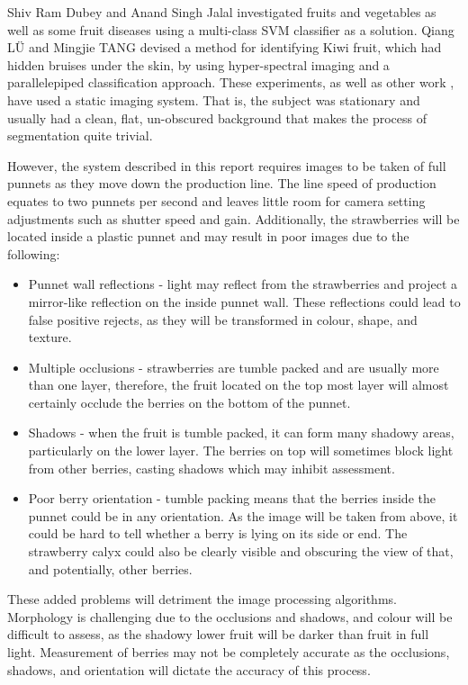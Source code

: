 \documentclass[fleqn,twoside,12pt]{report}
\begin{document}
Shiv Ram Dubey and Anand Singh Jalal \cite{shiv} investigated fruits and vegetables as well as some fruit diseases using a multi-class SVM classifier as a solution. Qiang LÜ and Mingjie TANG \cite{lu} devised a method for identifying Kiwi fruit, which had hidden bruises under the skin, by using hyper-spectral imaging and a parallelepiped classification approach. These experiments, as well as other work \cite{elmasry2,chiu}, have used a static imaging system. That is, the subject was stationary and usually had a clean, flat, un-obscured background that makes the process of segmentation quite trivial. 

However, the system described in this report requires images to be taken of full punnets as they move down the production line. The line speed of production equates to two punnets per second and leaves little room for camera setting adjustments such as shutter speed and gain. Additionally, the strawberries will be located inside a plastic punnet and may result in poor images due to the following:  

\begin{itemize}
	\item Punnet wall reflections - light may reflect from the strawberries and project a mirror-like reflection on the inside punnet wall. These reflections could lead to false positive rejects, as they will be transformed in colour, shape, and texture.
	\item Multiple occlusions - strawberries are tumble packed and are usually more than one layer, therefore, the fruit located on the top most layer will almost certainly occlude the berries on the bottom of the punnet. 
	\item Shadows - when the fruit is tumble packed, it can form many shadowy areas, particularly on the lower layer. The berries on top will sometimes block light from other berries, casting shadows which may inhibit assessment.
	\item Poor berry orientation - tumble packing means that the berries inside the punnet could be in any orientation. As the image will be taken from above, it could be hard to tell whether a berry is lying on its side or end. The strawberry calyx could also be clearly visible and obscuring the view of that, and potentially, other berries. 
\end{itemize}

These added problems will detriment the image processing algorithms. Morphology is challenging due to the occlusions and shadows, and colour will be difficult to assess, as the shadowy lower fruit will be darker than fruit in full light. Measurement of berries may not be completely accurate as the occlusions, shadows, and orientation will dictate the accuracy of this process.
\end{document}
